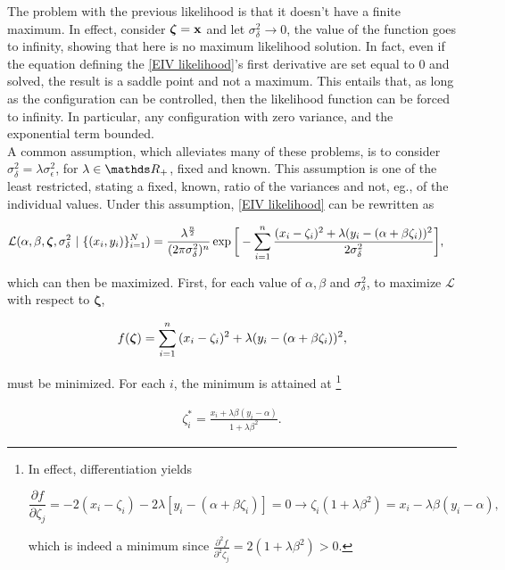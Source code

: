 \documentclass{homework}
\begin{document}
The problem with the previous likelihood is that it doesn't have a finite maximum. In effect, consider $\bm{\zeta} = {\bf x}$ and let $\sigma_\delta^2 \rightarrow 0$, the value of the function goes to infinity, showing that here is no maximum likelihood solution. In fact, even if the equation defining the \eqref{EIV likelihood}'s first derivative are set equal to 0 and solved, the result is a saddle point and not a maximum. This entails that, as long as the configuration can be controlled, then the likelihood function can be forced to infinity. In particular, any configuration with zero variance, and the exponential term bounded. \\

A common assumption, which alleviates many of these problems, is to consider $\sigma_\delta^2 = \lambda \sigma_\epsilon^2$, for $\lambda \in \R_{+}$, fixed and known. This assumption is one of the least restricted, stating a fixed, known, ratio of the variances and not, eg., of the individual values. Under this assumption, \eqref{EIV likelihood} can be rewritten as 

\begin{align}
    \mathcal{L}(\alpha, \beta, \bm{\zeta}, \sigma_{\delta}^2 \textnormal{ } &| \textnormal{ } \{(x_i, y_i)\}_{i=1}^{N}) =        \frac{{\lambda}^{\frac{n}{2}}}{(2\pi\sigma_{\delta}^2 )^{n}} \exp\bigg[-\sum_{i=1}^{n} \frac{(x_i - \zeta_i)^2 + \lambda(y_i - (\alpha + \beta \zeta_i))^2}{2\sigma_\delta^2}\bigg] 
    \label{EIV likelihood},
\end{align}

which can then be maximized. First, for each value of $\alpha, \beta$ and $\sigma^2_\delta$, to maximize $\mathcal{L}$ with respect to $\bm{\zeta}$, 

\begin{equation}
f(\bm{\zeta}) = \sum_{i=1}^{n} {(x_i - \zeta_i)^2 + \lambda(y_i - (\alpha + \beta \zeta_i))^2},
\label{EIV minimization}
\end{equation}

must be minimized. For each $i$, the minimum is attained at \footnote{In effect, differentiation yields

$$
\frac{\partial f}{\partial \zeta_j} = - 2(x_i - \zeta_i) - 2 \lambda [y_i - (\alpha + \beta \zeta_i)] = 0 \rightarrow \zeta_i(1+\lambda\beta^2) = x_i - \lambda \beta (y_i - \alpha),
$$

which is indeed a minimum since $\frac{\partial^2 f}{\partial^2 \zeta_j}= 2(1+\lambda\beta^2) > 0$.}

\begin{align*}
    \zeta_i^{*} = \frac{x_i + \lambda \beta(y_i - \alpha)}{1+\lambda \beta^2}. 
\end{align*}
\end{document}
